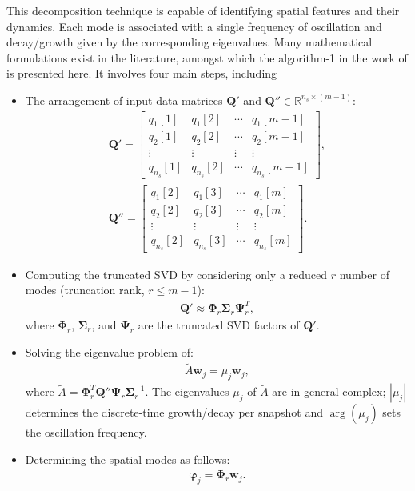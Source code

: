 \documentclass[a4paper,fleqn]{cas-sc}
\begin{document}
	This decomposition technique is capable of identifying spatial features and their dynamics. Each mode is associated with a single frequency of oscillation and decay/growth given by the corresponding eigenvalues. Many mathematical formulations exist in the literature, amongst which the algorithm-1 in the work of \citet{H.Tu2014} is presented here. It involves four main steps, including
	\begin{itemize}
		\item[1.] The arrangement of input data matrices $\mathbf{Q}'$ and $\mathbf{Q}''\in \mathbb{R}^{n_{s}\times (m-1)}$:
		\begin{subequations}\label{eq 6}
			\begin{align}
				\mathbf{Q}' = \begin{bmatrix}
					q_{1}[1] & q_{1}[2] & \cdots & q_{1}[m-1] \\
					q_{2}[1] & q_{2}[2] & \cdots & q_{2}[m-1] \\
					\vdots & \vdots & \vdots & \vdots \\
					q_{n_s}[1] & q_{n_s}[2] & \cdots & q_{n_s}[m-1]
				\end{bmatrix}, \label{eq 6a} \\
				\mathbf{Q}'' = \begin{bmatrix}
					q_{1}[2] & q_{1}[3] & \cdots & q_{1}[m] \\
					q_{2}[2] & q_{2}[3] & \cdots & q_{2}[m] \\
					\vdots & \vdots & \vdots & \vdots \\
					q_{n_s}[2] & q_{n_s}[3] & \cdots & q_{n_s}[m]
				\end{bmatrix}.\label{eq 6b}
			\end{align}
		\end{subequations}
		\item[2.] Computing the truncated SVD by considering only a reduced $r$ number of modes (truncation rank, $r\le m-1$):
		\begin{align}
			\mathbf{Q}' \approx \mathbf{\Phi}_r\mathbf{\Sigma} _r \mathbf{\Psi}_r^T, \label{eq 7}
		\end{align}
		where $\mathbf{\Phi}_r$, $\mathbf{\Sigma}_r$, and $\mathbf{\Psi}_r$ are the truncated SVD factors of $\mathbf{Q}'$.
		\item[3.] Solving the eigenvalue problem of:
		\begin{align}
			\tilde{A} \mathbf{w}_j = \mu_j \mathbf{w}_j, \label{eq 8}
		\end{align}
		where $\tilde{A}=\mathbf{\Phi}_r^T \mathbf{Q}'' \mathbf{\Psi}_r \mathbf{\Sigma}_r^{-1}$. The eigenvalues $\mu_j$ of $\tilde{A}$ are in general complex; $|\mu_j|$ determines the discrete-time growth/decay per snapshot and $\arg(\mu_j)$ sets the oscillation frequency.
		
		\item[4.] Determining the spatial modes as follows:
		\begin{align}
			\boldsymbol{\varphi} _j = \mathbf{\Phi}_r\mathbf{w}_j. \label{eq 9}
		\end{align}
		
	\end{itemize}
\end{document}
